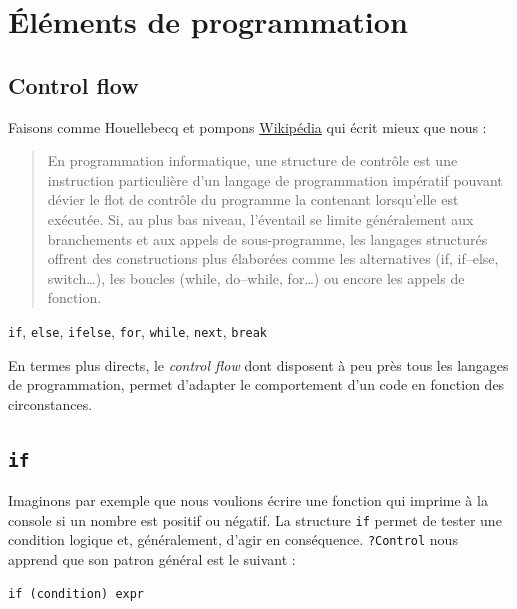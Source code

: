 \documentclass[
  letterpaper,
  DIV=11,
  numbers=noendperiod]{scrreprt}
\begin{document}
\hypertarget{uxe9luxe9ments-de-programmation}{%
\chapter{Éléments de
programmation}\label{uxe9luxe9ments-de-programmation}}

\hypertarget{control-flow}{%
\section{Control flow}\label{control-flow}}

Faisons comme Houellebecq et pompons
\href{https://fr.wikipedia.org/wiki/Structure_de_contr\%C3\%B4le}{Wikipédia}
qui écrit mieux que nous :

\begin{quote}
En programmation informatique, une structure de contrôle est une
instruction particulière d'un langage de programmation impératif pouvant
dévier le flot de contrôle du programme la contenant lorsqu'elle est
exécutée. Si, au plus bas niveau, l'éventail se limite généralement aux
branchements et aux appels de sous-programme, les langages structurés
offrent des constructions plus élaborées comme les alternatives (if,
if--else, switch\ldots), les boucles (while, do--while, for\ldots) ou
encore les appels de fonction.
\end{quote}

\texttt{if}, \texttt{else}, \texttt{ifelse}, \texttt{for},
\texttt{while}, \texttt{next}, \texttt{break}

En termes plus directs, le \emph{control flow} dont disposent à peu près
tous les langages de programmation, permet d'adapter le comportement
d'un code en fonction des circonstances.

\hypertarget{if}{%
\section{\texorpdfstring{\texttt{if}}{if}}\label{if}}

Imaginons par exemple que nous voulions écrire une fonction qui imprime
à la console si un nombre est positif ou négatif. La structure
\texttt{if} permet de tester une condition logique et, généralement,
d'agir en conséquence. \texttt{?Control} nous apprend que son patron
général est le suivant :

\begin{verbatim}
if (condition) expr
\end{verbatim}
\end{document}
